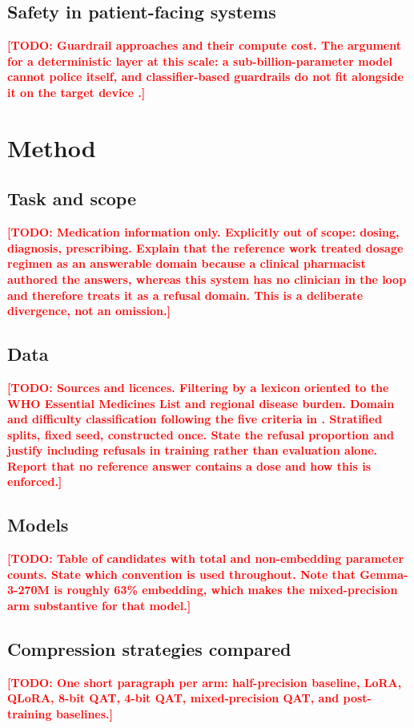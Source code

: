 \documentclass[10pt,twocolumn]{article}
\newcommand{\TODO}[1]{\textcolor{red}{\textbf{[TODO: #1]}}}
\begin{document}
\subsection{Safety in patient-facing systems}
\TODO{Guardrail approaches and their compute cost. The argument for a
deterministic layer at this scale: a sub-billion-parameter model cannot police
itself, and classifier-based guardrails do not fit alongside it on the target
device \citep{ong2024ethical}.}

\section{Method}

\subsection{Task and scope}
\TODO{Medication information only. Explicitly out of scope: dosing, diagnosis,
prescribing. Explain that the reference work treated dosage regimen as an
answerable domain because a clinical pharmacist authored the answers, whereas
this system has no clinician in the loop and therefore treats it as a refusal
domain. This is a deliberate divergence, not an omission.}

\subsection{Data}
\TODO{Sources and licences. Filtering by a lexicon oriented to the WHO
Essential Medicines List and regional disease burden. Domain and difficulty
classification following the five criteria in \citet{elangovan2025medpal}.
Stratified splits, fixed seed, constructed once. State the refusal proportion
and justify including refusals in training rather than evaluation alone.
Report that no reference answer contains a dose and how this is enforced.}

\subsection{Models}
\TODO{Table of candidates with total and non-embedding parameter counts. State
which convention is used throughout. Note that Gemma-3-270M is roughly 63\%
embedding, which makes the mixed-precision arm substantive for that model.}

\subsection{Compression strategies compared}
\TODO{One short paragraph per arm: half-precision baseline, LoRA, QLoRA,
8-bit QAT, 4-bit QAT, mixed-precision QAT, and post-training baselines.}
\end{document}

